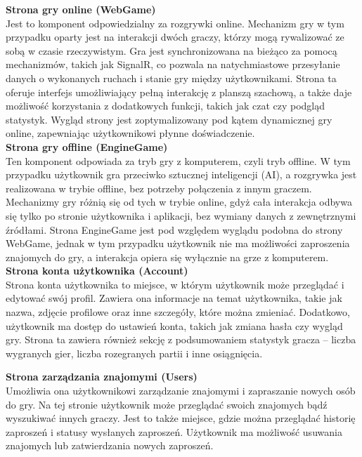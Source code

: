 \documentclass[twoside]{projektInzynierskiMS1}
\begin{document}
\noindent \textbf{Strona gry online (WebGame)}\\
Jest to komponent odpowiedzialny za rozgrywki online. Mechanizm gry w tym przypadku oparty jest na interakcji dwóch graczy, którzy mogą rywalizować ze sobą w czasie rzeczywistym. Gra jest synchronizowana na bieżąco za pomocą mechanizmów, takich jak SignalR, co pozwala na natychmiastowe przesyłanie danych o wykonanych ruchach i stanie gry między użytkownikami. Strona ta oferuje interfejs umożliwiający pełną interakcję z planszą szachową, a także daje możliwość korzystania z dodatkowych funkcji, takich jak czat czy podgląd statystyk. Wygląd strony jest zoptymalizowany pod kątem dynamicznej gry online, zapewniając użytkownikowi płynne doświadczenie.
\\

\noindent \textbf{Strona gry offline (EngineGame)}\\
Ten komponent odpowiada za tryb gry z komputerem, czyli tryb offline. W tym przypadku użytkownik gra przeciwko sztucznej inteligencji (AI), a rozgrywka jest realizowana w trybie offline, bez potrzeby połączenia z innym graczem. Mechanizmy gry różnią się od tych w trybie online, gdyż cała interakcja odbywa się tylko po stronie użytkownika i aplikacji, bez wymiany danych z zewnętrznymi źródłami. Strona EngineGame jest pod względem wyglądu podobna do strony WebGame, jednak w tym przypadku użytkownik nie ma możliwości zaproszenia znajomych do gry, a interakcja opiera się wyłącznie na grze z komputerem.
\\

\noindent \textbf{Strona konta użytkownika (Account)}\\
Strona konta użytkownika to miejsce, w którym użytkownik może przeglądać i edytować swój profil. Zawiera ona informacje na temat użytkownika, takie jak nazwa, zdjęcie profilowe oraz inne szczegóły, które można zmieniać. Dodatkowo, użytkownik ma dostęp do ustawień konta, takich jak zmiana hasła czy wygląd gry. Strona ta zawiera również sekcję z podsumowaniem statystyk gracza – liczba wygranych gier, liczba rozegranych partii i inne osiągnięcia.

\newpage

\noindent \textbf{Strona zarządzania znajomymi (Users)}\\
Umożliwia ona użytkownikowi zarządzanie znajomymi i zapraszanie nowych osób do gry. Na tej stronie użytkownik może przeglądać swoich znajomych bądź wyszukiwać innych graczy. Jest to także miejsce, gdzie można przeglądać historię zaproszeń i statusy wysłanych zaproszeń. Użytkownik ma możliwość usuwania znajomych lub zatwierdzania nowych zaproszeń.
\\
\end{document}
